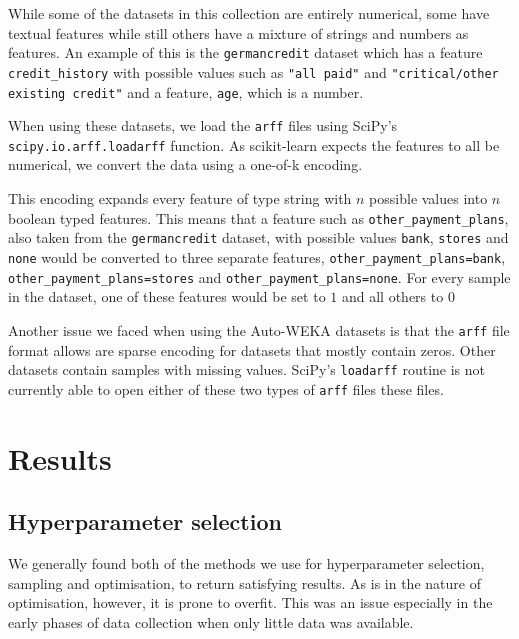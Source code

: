 \documentclass[a4paper,12pt,twoside,openright]{report}
\begin{document}

While some of the datasets in this collection are entirely numerical, some have textual features while still others have a mixture of strings and numbers as features. An example of this is the \texttt{germancredit} dataset which has a feature \texttt{credit\_history} with possible values such as \texttt{"all paid"} and \texttt{"critical/other existing credit"} and a feature,  \texttt{age}, which is a number.

When using these datasets, we load the \texttt{arff} files using SciPy's \texttt{scipy.io.arff.loadarff} function. As scikit-learn expects the features to all be numerical, we convert the data using a one-of-k encoding.

This encoding expands every feature of type string with $n$ possible values into $n$ boolean typed features. This means that a feature such as \texttt{other\_payment\_plans}, also taken from the \texttt{germancredit} dataset, with possible values \texttt{bank}, \texttt{stores} and \texttt{none} would be converted to three separate features, \texttt{other\_payment\_plans=bank}, \texttt{other\_payment\_plans=stores} and \texttt{other\_payment\_plans=none}. For every sample in the dataset, one of these features would be set to $1$ and all others to $0$

Another issue we faced when using the Auto-WEKA datasets is that the \texttt{arff} file format allows are sparse encoding for datasets that mostly contain zeros. Other datasets contain samples with missing values. SciPy's \texttt{loadarff} routine is not currently able to open either of these two types of \texttt{arff} files these files.


\section{Results}

\subsection{Hyperparameter selection}
We generally found both of the methods we use for hyperparameter selection, sampling and optimisation, to return satisfying results. As is in the nature of optimisation, however, it is prone to overfit. This was  an issue especially in the early phases of data collection when only little data was available.
\end{document}
